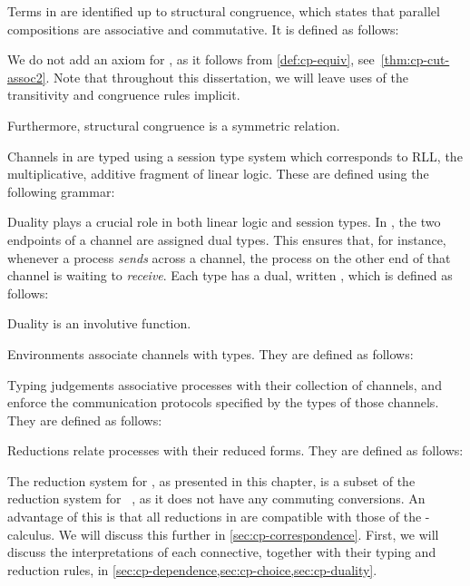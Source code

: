 Terms in \rcp are identified up to structural congruence, which states that
parallel compositions  are associative and commutative.
It is defined as follows:

We do not add an axiom for , as it follows from
\cref{def:cp-equiv}, see~\cref{thm:cp-cut-assoc2}.
Note that throughout this dissertation, we will leave uses of the transitivity
and congruence rules implicit.

Furthermore, structural congruence is a symmetric relation.

%
Channels in \rcp are typed using a session type system which corresponds to RLL,
the multiplicative, additive fragment of linear logic.
These are defined using the following grammar:

Duality plays a crucial role in both linear logic and session types.
In \cp, the two endpoints of a channel are assigned dual types.
This ensures that, for instance, whenever a process \emph{sends} across a
channel, the process on the other end of that channel is waiting to
\emph{receive}.
Each type  has a dual, written , which is defined as follows:

Duality is an involutive function.

%
Environments associate channels with types. They are defined as follows:

Typing judgements associative processes with their collection of channels, and
enforce the communication protocols specified by the types of those channels.
They are defined as follows:


Reductions relate processes with their reduced forms.
They are defined as follows:


The reduction system for \rcp, as presented in this chapter, is a subset of the
reduction system for \cp~\cite{wadler2012}, as it does not have any commuting
conversions.
An advantage of this is that all reductions in \rcp are compatible with those of
the \textpi-calculus. We will discuss this further in \cref{sec:cp-correspondence}.
First, we will discuss the interpretations of each connective, together with
their typing and reduction rules, in \cref{sec:cp-dependence,sec:cp-choice,sec:cp-duality}.

